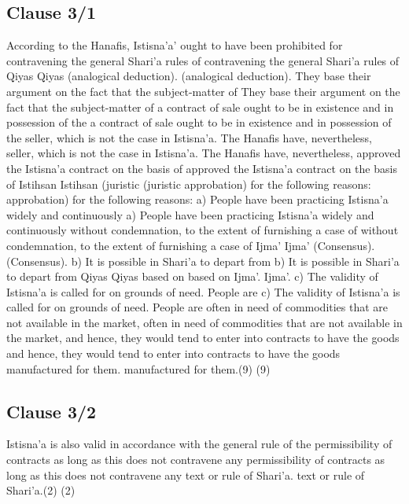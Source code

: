\documentclass{article}%
\begin{document}
\subsection{Clause 3/1}%
\label{subsec:Clause3/1}%
According to the Hanafis, Istisna’a’ ought to have been prohibited for  contravening the general Shari’a rules of  contravening the general Shari’a rules of Qiyas Qiyas (analogical deduction).   (analogical deduction).  They base their argument on the fact that the subject-matter of  They base their argument on the fact that the subject-matter of  a contract of sale ought to be in existence and in possession of the  a contract of sale ought to be in existence and in possession of the  seller, which is not the case in Istisna’a. The Hanafis have, nevertheless,  seller, which is not the case in Istisna’a. The Hanafis have, nevertheless,  approved the Istisna’a contract on the basis of  approved the Istisna’a contract on the basis of Istihsan Istihsan (juristic   (juristic  approbation) for the following reasons: approbation) for the following reasons: a) People have been practicing Istisna’a widely and continuously  a) People have been practicing Istisna’a widely and continuously  without condemnation, to the extent of furnishing a case of  without condemnation, to the extent of furnishing a case of Ijma’  Ijma’  (Consensus). (Consensus). b) It is possible in Shari’a to depart from  b) It is possible in Shari’a to depart from Qiyas Qiyas based on   based on Ijma’. Ijma’. c) The validity of Istisna’a is called for on grounds of need. People are  c) The validity of Istisna’a is called for on grounds of need. People are  often in need of commodities that are not available in the market,  often in need of commodities that are not available in the market,  and hence, they would tend to enter into contracts to have the goods  and hence, they would tend to enter into contracts to have the goods  manufactured for them. manufactured for them.(9) (9)

%
\subsection{Clause 3/2}%
\label{subsec:Clause3/2}%
Istisna’a is also valid in accordance with the general rule of the  permissibility of contracts as long as this does not contravene any  permissibility of contracts as long as this does not contravene any  text or rule of Shari’a. text or rule of Shari’a.(2) (2)

%
\end{document}
